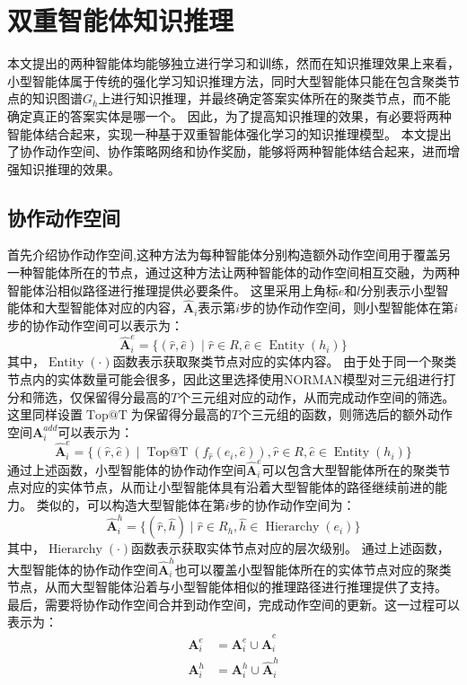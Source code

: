 \documentclass[algorithmlist, AutoFakeBold, AutoFakeSlant, figurelist, tablelist, nomlist, engineering, openany]{seuthesix} %
\begin{document}
\section{双重智能体知识推理}
本文提出的两种智能体均能够独立进行学习和训练，然而在知识推理效果上来看，小型智能体属于传统的强化学习知识推理方法，同时大型智能体只能在包含聚类节点的知识图谱$G_h$上进行知识推理，并最终确定答案实体所在的聚类节点，而不能确定真正的答案实体是哪一个。
因此，为了提高知识推理的效果，有必要将两种智能体结合起来，实现一种基于双重智能体强化学习的知识推理模型。
本文提出了协作动作空间、协作策略网络和协作奖励，能够将两种智能体结合起来，进而增强知识推理的效果。

\subsection{协作动作空间}
首先介绍协作动作空间,这种方法为每种智能体分别构造额外动作空间用于覆盖另一种智能体所在的节点，通过这种方法让两种智能体的动作空间相互交融，为两种智能体沿相似路径进行推理提供必要条件。
这里采用上角标$e$和$l$分别表示小型智能体和大型智能体对应的内容，$\bm{\hat{A}}_i$表示第$i$步的协作动作空间，则小型智能体在第$i$步的协作动作空间可以表示为：
\begin{equation}
  \bm{\hat{A}}_i^{e} = \{(\hat{r}, \hat{e}) \mid \hat{r} \in R, \hat{e} \in \operatorname{Entity}(h_i)\}
\end{equation}
其中，$\operatorname{Entity}(\cdot)$函数表示获取聚类节点对应的实体内容。
由于处于同一个聚类节点内的实体数量可能会很多，因此这里选择使用NORMAN模型对三元组进行打分和筛选，仅保留得分最高的$T$个三元组对应的动作，从而完成动作空间的筛选。
这里同样设置$\operatorname{Top@T}$为保留得分最高的$T$个三元组的函数，则筛选后的额外动作空间$\bm{A}_{i}^{add}$可以表示为：
\begin{equation}
  \bm{\hat{A}}_i^{e} = \{(\hat{r}, \hat{e}) \mid \operatorname{Top@T}(f_{\hat{r}}(e_i, \hat{e})), \hat{r} \in R, \hat{e} \in \operatorname{Entity}(h_i) \}
  \label{coo_1}
\end{equation}
通过上述函数，小型智能体的协作动作空间$\bm{\hat{A}}_i^{e}$可以包含大型智能体所在的聚类节点对应的实体节点，从而让小型智能体具有沿着大型智能体的路径继续前进的能力。
类似的，可以构造大型智能体在第$i$步的协作动作空间为：
\begin{equation}
  \bm{\hat{A}}_i^{h} = \{(\hat{r}, \hat{h}) \mid \hat{r} \in R_h, \hat{h} \in \operatorname{Hierarchy}(e_i)\}
  \label{coo_2}
\end{equation}
其中，$\operatorname{Hierarchy}(\cdot)$函数表示获取实体节点对应的层次级别。
通过上述函数，大型智能体的协作动作空间$\bm{\hat{A}}_i^{h}$也可以覆盖小型智能体所在的实体节点对应的聚类节点，从而大型智能体沿着与小型智能体相似的推理路径进行推理提供了支持。
最后，需要将协作动作空间合并到动作空间，完成动作空间的更新。这一过程可以表示为：
\begin{equation}
  \begin{aligned}
    \bm{A}_i^{e} &= \bm{A}_i^{e} \cup \bm{\hat{A}}_i^{e} \\
    \bm{A}_i^{h} &= \bm{A}_i^{h} \cup \bm{\hat{A}}_i^{h}
  \end{aligned}
\end{equation}
\end{document}
